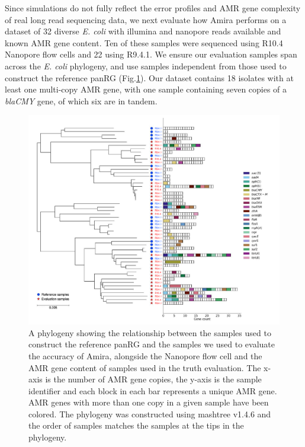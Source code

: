 Since simulations do not fully reflect the error profiles and AMR gene complexity of real long read sequencing data, we next evaluate how Amira performs on a dataset of 32 diverse \textit{E. coli} with illumina and nanopore reads available and known AMR gene content. Ten of these samples were sequenced using R10.4 Nanopore flow cells and 22 using R9.4.1. We ensure our evaluation samples span across the \textit{E. coli} phylogeny, and use samples independent from those used to construct the reference panRG (Fig.\ref{fig:3}). Our dataset contains 18 isolates with at least one multi-copy AMR gene, with one sample containing seven copies of a \textit{blaCMY} gene, of which six are in tandem. 

\begin{figure}
\centering
\includegraphics[width=1\linewidth]{Figures/figure_3.pdf}
\caption{A phylogeny showing the relationship between the samples used to construct the reference panRG and the samples we used to evaluate the accuracy of Amira, alongside the Nanopore flow cell and the AMR gene content of samples used in the truth evaluation. The x-axis is the number of AMR gene copies, the y-axis is the sample identifier and each block in each bar represents a unique AMR gene. AMR genes with more than one copy in a given sample have been colored. The phylogeny was constructed using mashtree v1.4.6 \cite{Katz2019} and the order of samples matches the samples at the tips in the phylogeny.}
\label{fig:3}
\end{figure}

